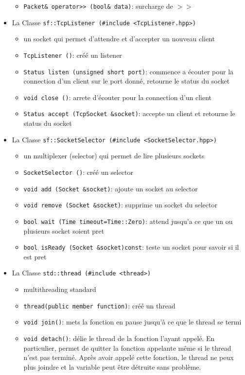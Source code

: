 \documentclass[12pt,a4paper,twoside]{article}
\begin{document}
\begin{itemize}
\begin{itemize}
            \item{} \lstinline$Packet& operator>> (bool& data)$\;: surcharge de $>>$
        \end{itemize}
        \item{} La Classe \lstinline$sf::TcpListener (#include <TcpListener.hpp>)$
        \begin{itemize}
            \item{} un socket qui permet d'attendre et d'accepter un nouveau client
            \item{} \lstinline$TcpListener ()$\;: créé un listener
            \item{} \lstinline$Status listen (unsigned short port)$\;: commence a écouter pour la connection d'un client sur le port donné, retourne le status du socket
            \item{} \lstinline$void close ()$\;: arrete d'écouter pour la connection d'un client
            \item{} \lstinline$Status accept (TcpSocket &socket)$\;: accepte un client et retourne le status du socket
        \end{itemize}
        \item{} La Classe \lstinline$sf::SocketSelector (#include <SocketSelector.hpp>)$
        \begin{itemize}
            \item{} un multiplexer (selector) qui permet de lire plusieurs sockets
            \item{} \lstinline$SocketSelector ()$\;: créé un selector
            \item{} \lstinline$void add (Socket &socket)$\;: ajoute un socket au selector
            \item{} \lstinline$void remove (Socket &socket)$\;: supprime un socket du selector
            \item{} \lstinline$bool wait (Time timeout=Time::Zero)$\;: attend jusqu'a ce que un ou plusieurs socket soient pret
            \item{} \lstinline$bool isReady (Socket &socket)const$\;: teste un socket pour savoir si il est pret
        \end{itemize}
        \item{} La Classe \lstinline$std::thread (#include <thread>)$
        \begin{itemize}
            \item{} multithreading standard
            \item{} \lstinline$thread(public member function)$\;: créé un thread
            \item{} \lstinline$void join()$\;: mets la fonction en pause jusqu'à ce que le thread se termi
            \item{} \lstinline$void detach()$\;: délie le thread de la fonction l'ayant appelé. En particulier, permet de quitter la fonction appelante même si le thread n'est pas terminé. Après avoir appelé cette fonction, le thread ne peux plus joindre et la variable peut être détruite sans problème.
        \end{itemize}
    \end{itemize}
\end{document}

